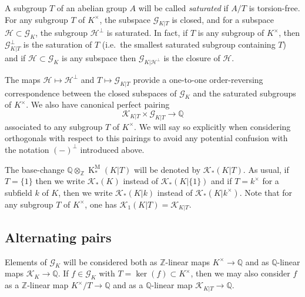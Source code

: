 \documentclass[12pt]{amsart}
\newcommand{\KM}{\operatorname{K}^\mathrm{M}}
\newcommand{\Zbb}{\mathbb{Z}}
\newcommand{\Qbb}{\mathbb{Q}}
\newcommand{\Gcal}{\mathcal{G}}
\newcommand{\Hcal}{\mathcal{H}}
\newcommand{\Kcal}{\mathcal{K}}
\theoremstyle{definition}
\begin{document}
A subgroup $T$ of an abelian group $A$ will be called \emph{saturated} if $A/T$ is torsion-free.
For any subgroup $T$ of $K^{\times}$, the subspace $\Gcal_{K|T}$ is closed, and for a subspace $\Hcal \subset \Gcal_{K}$, the subgroup $\Hcal^{\perp}$ is saturated.
In fact, if $T$ is any subgroup of $K^{\times}$, then $\Gcal_{K|T}^{\perp}$ is the saturation of $T$ (i.e.~the smallest saturated subgroup containing $T$) and if $\Hcal \subset \Gcal_{K}$ is any subspace then $\Gcal_{K|\Hcal^{\perp}}$ is the closure of $\Hcal$.

The maps $\Hcal \mapsto \Hcal^{\perp}$ and $T \mapsto \Gcal_{K|T}$ provide a one-to-one order-reversing correspondence between the closed subspaces of $\Gcal_{K}$ and the saturated subgroups of $K^{\times}$.
We also have canonical perfect pairing
\[ \Kcal_{K|T} \times \Gcal_{K|T} \to \Qbb \]
associated to any subgroup $T$ of $K^{\times}$.
We will say so explicitly when considering orthogonals with respect to this pairings to avoid any potential confusion with the notation $(-)^{\perp}$ introduced above.

The base-change $\Qbb \otimes_{\Zbb} \KM_{*}(K|T)$ will be denoted by $\Kcal_{*}(K|T)$.
As usual, if $T = \{1\}$ then we write $\Kcal_{*}(K)$ instead of $\Kcal_{*}(K|\{1\})$ and if $T = k^{\times}$ for a subfield $k$ of $K$, then we write $\Kcal_{*}(K|k)$ instead of $\Kcal_{*}(K|k^{\times})$.
Note that for any subgroup $T$ of $K^{\times}$, one has $\Kcal_{1}(K|T) = \Kcal_{K|T}$.

\subsection{Alternating pairs}

Elements of $\Gcal_{K}$ will be considered both as $\Zbb$-linear maps $K^{\times} \to \Qbb$ and as $\Qbb$-linear maps $\Kcal_{K} \to \Qbb$.
If $f \in \Gcal_{K}$ with $T = \ker(f) \subset K^{\times}$, then we may also consider $f$ as a $\Zbb$-linear map $K^{\times}/T \to \Qbb$ and as a $\Qbb$-linear map $\Kcal_{K|T} \to \Qbb$.
\end{document}

